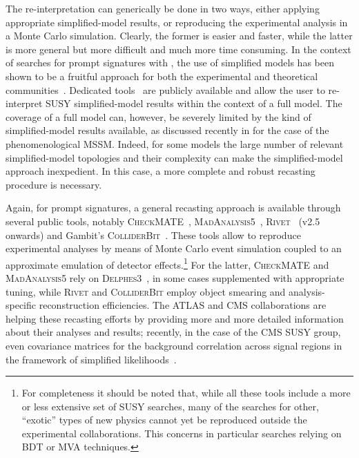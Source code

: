 The re-interpretation can generically be done in two ways, either applying
appropriate simplified-model results, or reproducing the experimental analysis in a Monte Carlo simulation. Clearly,  the former is easier and faster, 
while the latter is more general but more difficult and much more time consuming. 
In the context of searches for prompt signatures with \MET, the use of simplified models has been shown to be a fruitful approach for both the experimental and theoretical communities~\cite{hep-ph/0703088, 0810.3921, 1105.2838, Okawa:2011xg,1301.2175,Boveia:2016mrp}. 
Dedicated tools~\cite{Kraml:2013mwa,Ambrogi:2017neo,Papucci:2014rja} are publicly 
available and allow the user to re-interpret SUSY simplified-model results within the context of a full model.
The coverage of a full model can, however, be severely limited by the kind of simplified-model results available, 
as discussed recently in \cite{Ambrogi:2017lov} for the case of the phenomenological MSSM.
Indeed, for some models the large number of relevant simplified-model topologies and their complexity
can make the simplified-model approach inexpedient. 
In this case, a more complete and robust recasting procedure is necessary. 

Again, for prompt signatures, a general recasting approach is available through several public 
tools, notably \textsc{CheckMATE}~\cite{Drees:2013wra,Dercks:2016npn}, \textsc{MadAnalysis5}~\cite{Conte:2014zja,Dumont:2014tja}, 
\textsc{Rivet}~{\bf\cite{Buckley:2010ar}} (v2.5 onwards) and Gambit's \textsc{ColliderBit}~\cite{Balazs:2017moi}.
These tools allow to reproduce experimental analyses by means of Monte Carlo event simulation coupled to 
an approximate emulation of detector effects.\footnote{For completeness it should be noted that, while all these tools include a more or less 
extensive set of SUSY searches, many of the searches for other, ``exotic'' types of new physics cannot yet be reproduced outside the experimental collaborations. This concerns in particular searches relying on BDT or MVA techniques.} 
For the latter, \textsc{CheckMATE} and \textsc{MadAnalysis5} rely on \textsc{Delphes3}~\cite{deFavereau:2013fsa}, 
in some cases supplemented with appropriate tuning, 
while \textsc{Rivet} and \textsc{ColliderBit} employ object smearing and analysis-specific reconstruction efficiencies. 
The ATLAS and CMS collaborations are helping these recasting efforts by providing more and more 
detailed information about their analyses and results; recently, in the case of the CMS SUSY group, 
even covariance matrices for the background correlation across signal regions in the 
framework of simplified likelihoods~\cite{CMS-NOTE-2017-001}.

